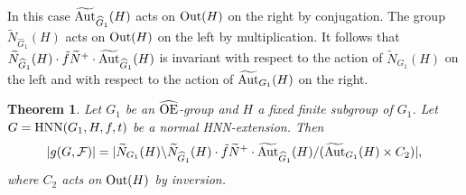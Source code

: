 \documentclass[a4paper,12pt]{article}
\newtheorem{thm}{Theorem}[section]
\newcommand{\A}{{\cal A}}
\newcommand{\Oe}{\rm \widehat{OE}}
\newcommand{\F}{{\cal F}}
\def\aut {{\rm Aut}}
\def\out {{\rm Out}}
\def\hnn {{\rm HNN}}
\def\Iso {{\rm Iso}}
\begin{document}
In this case  $\widetilde{\aut}_{\widehat G_1}(H)$ acts on $\out(H)$ on the right by conjugation. The group $\widetilde{N}_{\widehat G_1}(H)$ acts on $\out(H)$ on the left by multiplication. It follows that $\widetilde{N}_{\widehat G_1}(H) \cdot \tilde{f} \widetilde{N}^+ \cdot \widetilde{\aut}_{\widehat G_1}(H)$ is invariant with respect to the action of $\widetilde{N}_{G_1}(H)$ on the left and with respect to the action of $\widetilde{\aut}_{G_1}(H)$ on the right.







\begin{thm}  Let $G_1$ be an $\Oe$-group and $H$ a fixed finite subgroup of $G_1$. Let $G=\hnn(G_1,H, f,t)$ be a normal HNN-extension.  Then $$|g(G, \mathcal{F})| = | \widetilde{N}_{G_1}(H) \backslash \widetilde{N}_{\widehat G_1}(H) \cdot \tilde{f}\widetilde{N}^+ \cdot \widetilde{\aut}_{\widehat G_1}(H)/( \widetilde{\aut}_{G_1}(H) \times C_2)|,$$ where $C_2$ acts on $\out(H)$ by inversion. 
\end{thm}








\end{document}
